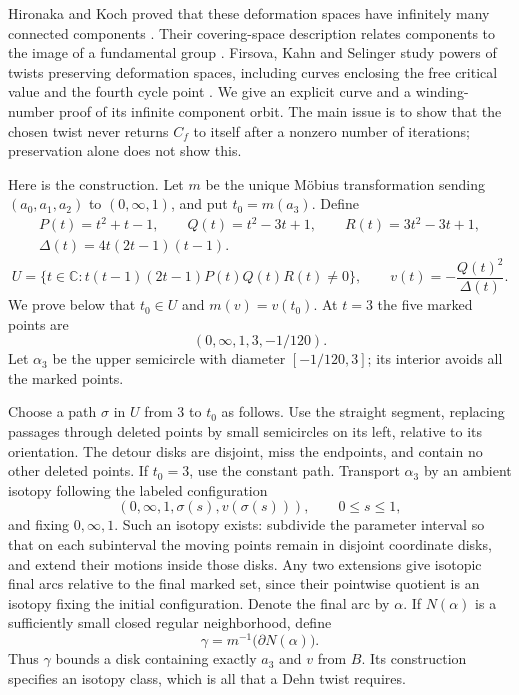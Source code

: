 \documentclass[11pt]{article}
\newcommand{\C}{\mathbb C}
\theoremstyle{remark}
\begin{document}
Hironaka and Koch proved that these deformation spaces have infinitely many connected components \cite[Theorem 1.3]{HK}. Their covering-space description relates components to the image of a fundamental group \cite[Section 3.2]{HK}. Firsova, Kahn and Selinger study powers of twists preserving deformation spaces, including curves enclosing the free critical value and the fourth cycle point \cite[Lemmas 5.3 and 5.5, Section 6.1]{FKS}. We give an explicit curve and a winding-number proof of its infinite component orbit. The main issue is to show that the chosen twist never returns $C_f$ to itself after a nonzero number of iterations; preservation alone does not show this.

Here is the construction. Let $m$ be the unique M\"obius transformation sending $(a_0,a_1,a_2)$ to $(0,\infty,1)$, and put $t_0=m(a_3)$. Define
\begin{gather*}
 P(t)=t^2+t-1,\qquad Q(t)=t^2-3t+1,\qquad R(t)=3t^2-3t+1,\\
 \Delta(t)=4t(2t-1)(t-1).
\end{gather*}
\begin{equation}\label{eq:U}
 U=\{t\in\C:t(t-1)(2t-1)P(t)Q(t)R(t)\ne0\},
 \qquad v(t)=-\frac{Q(t)^2}{\Delta(t)}.
\end{equation}
We prove below that $t_0\in U$ and $m(v)=v(t_0)$. At $t=3$ the five marked points are
\[
 (0,\infty,1,3,-1/120).
\]
Let $\alpha_3$ be the upper semicircle with diameter $[-1/120,3]$; its interior avoids all the marked points.

Choose a path $\sigma$ in $U$ from $3$ to $t_0$ as follows. Use the straight segment, replacing passages through deleted points by small semicircles on its left, relative to its orientation. The detour disks are disjoint, miss the endpoints, and contain no other deleted points. If $t_0=3$, use the constant path. Transport $\alpha_3$ by an ambient isotopy following the labeled configuration
\begin{equation}\label{eq:config}
 (0,\infty,1,\sigma(s),v(\sigma(s))),\qquad 0\leq s\leq1,
\end{equation}
and fixing $0,\infty,1$. Such an isotopy exists: subdivide the parameter interval so that on each subinterval the moving points remain in disjoint coordinate disks, and extend their motions inside those disks. Any two extensions give isotopic final arcs relative to the final marked set, since their pointwise quotient is an isotopy fixing the initial configuration. Denote the final arc by $\alpha$. If $N(\alpha)$ is a sufficiently small closed regular neighborhood, define
\begin{equation}\label{eq:gamma}
 \gamma=m^{-1}\bigl(\partial N(\alpha)\bigr).
\end{equation}
Thus $\gamma$ bounds a disk containing exactly $a_3$ and $v$ from $B$. Its construction specifies an isotopy class, which is all that a Dehn twist requires.
\end{document}
